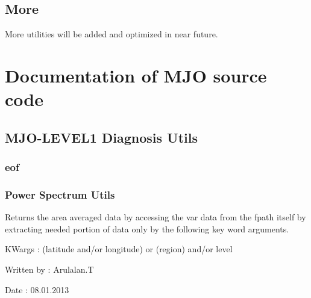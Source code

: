 \documentclass[letterpaper,10pt,english]{sphinxmanual}
\begin{document}
\section{More}
\label{diagnosis:more}
More utilities will be added and optimized in near future.


\chapter{Documentation of \textbf{MJO} source code}
\label{mjo:mjo}\label{mjo::doc}\label{mjo:documentation-of-mjo-source-code}

\section{MJO-LEVEL1 Diagnosis Utils}
\label{mjo:mjo-level1-diagnosis-utils}

\subsection{eof}
\label{mjo:module-eof_diag}\label{mjo:eof}

\begin{fulllineitems}
\label{mjo:eof_diag.genEofVars}
\end{fulllineitems}



\subsection{Power Spectrum Utils}
\label{mjo:power-spectrum-utils}\label{mjo:module-psutils}

\begin{fulllineitems}
\label{mjo:psutils.areaAvg}
Returns the area averaged data by accessing the var data from the fpath
itself by extracting needed portion of data only by the following
key word arguments.

KWargs : (latitude and/or longitude) or (region) and/or level

Written by : Arulalan.T

Date : 08.01.2013

\end{fulllineitems}
\end{document}
